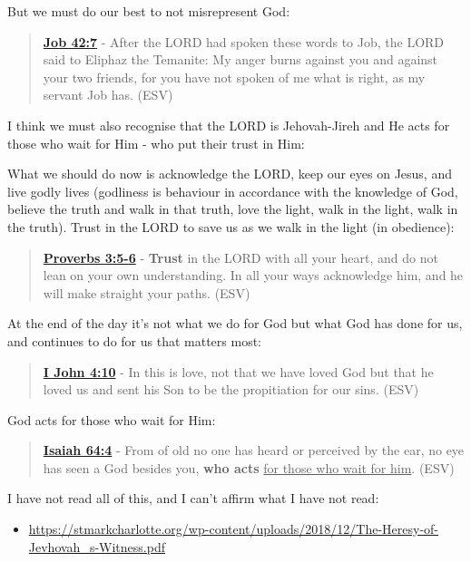\documentclass[11pt]{article}
\begin{document}
But we must do our best to not misrepresent God:

\begin{quote}
\textbf{\href{https://www.biblegateway.com/passage/?search=Job\%2042\%3A7\&version=ESV}{Job 42:7}} - After the LORD had spoken these words to Job, the LORD said to Eliphaz the Temanite: My anger burns against you and against your two friends, for you have not spoken of me what is right, as my servant Job has. (ESV)
\end{quote}

I think we must also recognise that the LORD is Jehovah-Jireh and He acts for those who wait for Him - who put their trust in Him:

What we should do now is acknowledge the LORD, keep our eyes on Jesus, and live godly lives (godliness is behaviour in accordance with the knowledge of God, believe the truth and walk in that truth, love the light, walk in the light, walk in the truth). Trust in the LORD to save us as we walk in the light (in obedience):

\begin{quote}
\textbf{\href{https://www.biblegateway.com/passage/?search=Proverbs\%203\%3A5-6\&version=ESV}{Proverbs 3:5-6}} - \textbf{Trust} in the LORD with all your heart, and do not lean on your own understanding. In all your ways acknowledge him, and he will make straight your paths. (ESV)
\end{quote}

At the end of the day it's not what we do for God but what God has done for us, and continues to do for us that matters most:

\begin{quote}
\textbf{\href{https://www.biblegateway.com/passage/?search=1\%20John\%204\%3A10\&version=ESV}{I John 4:10}} - In this is love, not that we have loved God but that he loved us and sent his Son to be the propitiation for our sins. (ESV)
\end{quote}

God acts for those who wait for Him:

\begin{quote}
\textbf{\href{https://www.biblegateway.com/passage/?search=Isaiah\%2064\%3A4\&version=ESV}{Isaiah 64:4}} - From of old no one has heard or perceived by the ear, no eye has seen a God besides you, \textbf{who acts} \uline{for those who wait for him}. (ESV)
\end{quote}

I have not read all of this, and I can't affirm what I have not read:
\begin{itemize}
\item \url{https://stmarkcharlotte.org/wp-content/uploads/2018/12/The-Heresy-of-Jevhovah\_s-Witness.pdf}
\end{itemize}
\end{document}
